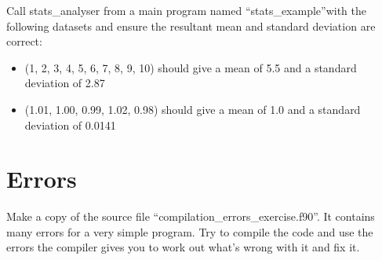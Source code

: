 \documentclass[11pt,a4paper]{article}
\begin{document}
Call stats\_analyser from a main program named ``stats\_example''with the following datasets and ensure the resultant mean and standard deviation are correct:
\begin{itemize}
    \item (1, 2, 3, 4, 5, 6, 7, 8, 9, 10) should give a mean of 5.5 and a standard deviation of 2.87
    \item (1.01, 1.00, 0.99, 1.02, 0.98) should give a mean of 1.0 and a standard deviation of  0.0141
\end{itemize}

\section{Errors}
Make a copy of the source file ``compilation\_errors\_exercise.f90''. It contains many errors for a very simple program. Try to compile the code and use the errors the compiler gives you to work out what's wrong with it and fix it.
\end{document}
